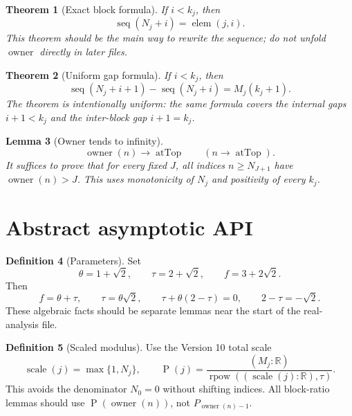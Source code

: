\documentclass[11pt]{article}
\theoremstyle{definition}
\newtheorem{definition}{Definition}[section]
\theoremstyle{plain}
\newtheorem{theorem}[definition]{Theorem}
\newtheorem{lemma}[definition]{Lemma}
\theoremstyle{remark}
\newcommand{\R}{\mathbb{R}}
\newcommand{\elem}{\operatorname{elem}}
\newcommand{\owner}{\operatorname{owner}}
\newcommand{\seq}{\operatorname{seq}}
\newcommand{\thetaC}{\theta}
\newcommand{\tauC}{\tau}
\newcommand{\fexp}{f}
\newcommand{\rpow}{\operatorname{rpow}}
\newcommand{\atTop}{\operatorname{atTop}}
\newcommand{\Pfun}{\operatorname{P}}
\newcommand{\Scale}{\operatorname{scale}}
\begin{document}
\begin{theorem}[Exact block formula]\label{thm:v9-exact-block-formula}
If \(i<k_j\), then
\[
        \seq(N_j+i)=\elem(j,i).
\]
This theorem should be the main way to rewrite the sequence; do not unfold \(\owner\) directly in later files.
\end{theorem}

\begin{theorem}[Uniform gap formula]\label{thm:v9-uniform-gap}
If \(i<k_j\), then
\[
        \seq(N_j+i+1)-\seq(N_j+i)=M_j(k_j+1).
\]
The theorem is intentionally uniform: the same formula covers the internal gaps \(i+1<k_j\) and the inter-block gap \(i+1=k_j\).
\end{theorem}

\begin{lemma}[Owner tends to infinity]\label{lem:v9-owner-atTop}
\[
        \owner(n)\to\atTop\qquad(n\to\atTop).
\]
It suffices to prove that for every fixed \(J\), all indices \(n\ge N_{J+1}\) have \(\owner(n)>J\).  This uses monotonicity of \(N_j\) and positivity of every \(k_j\).
\end{lemma}

\section{Abstract asymptotic API}\label{sec:v9-asymptotic-api}

\begin{definition}[Parameters]\label{def:v9-params}
Set
\[
        \thetaC=1+\sqrt2,
        \qquad
        \tauC=2+\sqrt2,
        \qquad
        \fexp=3+2\sqrt2.
\]
Then
\[
        \fexp=\thetaC+\tauC,
        \qquad
        \tauC=\thetaC\sqrt2,
        \qquad
        \tauC+\thetaC(2-\tauC)=0,
        \qquad
        2-\tauC=-\sqrt2.
\]
These algebraic facts should be separate lemmas near the start of the real-analysis file.
\end{definition}

\begin{definition}[Scaled modulus]\label{def:v9-scaled-modulus}
Use the Version 10 total scale
\[
        \Scale(j)=\max\{1,N_j\},
        \qquad
        \Pfun(j)=\frac{(M_j:\R)}{\rpow((\Scale(j):\R),\tauC)}.
\]
This avoids the denominator \(N_0=0\) without shifting indices.  All block-ratio lemmas should use \(\Pfun(\owner(n))\), not \(P_{\owner(n)-1}\).
\end{definition}
\end{document}
